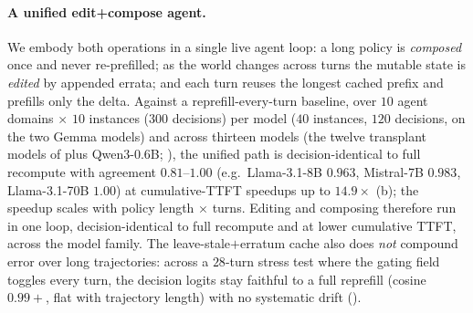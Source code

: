 \paragraph{A unified edit+compose agent.} We embody both operations in a single live agent loop: a long
policy is \emph{composed} once and never re-prefilled; as the world changes across turns the mutable state
is \emph{edited} by appended errata; and each turn reuses the longest cached prefix and prefills only the
delta. Against a reprefill-every-turn baseline, over $10$ agent domains $\times$ $10$ instances ($300$
decisions) per model ($40$ instances, $120$ decisions, on the two Gemma models) and across thirteen
models (the twelve transplant models of  plus Qwen3-0.6B; ), the unified
path is decision-identical to full recompute
with agreement $0.81$--$1.00$ (e.g.\ Llama-3.1-8B $0.963$, Mistral-7B $0.983$, Llama-3.1-70B $1.00$) at
cumulative-TTFT speedups up to $14.9\times$ (b); the speedup scales with policy length
$\times$ turns. Editing and composing therefore run in one loop, decision-identical to full recompute and at lower cumulative TTFT, across the model
family. The leave-stale$+$erratum cache also does \emph{not} compound error over long trajectories: across
a $28$-turn stress test where the gating field toggles every turn, the decision logits stay faithful to a
full reprefill (cosine $0.99{+}$, flat with trajectory length) with no systematic drift
().
